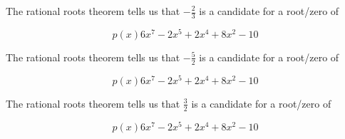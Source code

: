 \documentclass{ximera}
\begin{document}
\begin{exercise}
\begin{question}

The rational roots theorem tells us that $-\frac{2}{3}$ is a candidate for a root/zero of 

\[
p(x) 6x^7 - 2x^5 + 2x^4 + 8x^2 - 10
\]


\begin{multipleChoice}
\end{multipleChoice}




\end{question}












\begin{question}

The rational roots theorem tells us that $-\frac{5}{2}$ is a candidate for a root/zero of 

\[
p(x) 6x^7 - 2x^5 + 2x^4 + 8x^2 - 10
\]


\begin{multipleChoice}
\end{multipleChoice}




\end{question}











\begin{question}

The rational roots theorem tells us that $\frac{3}{2}$ is a candidate for a root/zero of 

\[
p(x) 6x^7 - 2x^5 + 2x^4 + 8x^2 - 10
\]


\begin{multipleChoice}
\end{multipleChoice}




\end{question}









\end{exercise}
\end{document}
